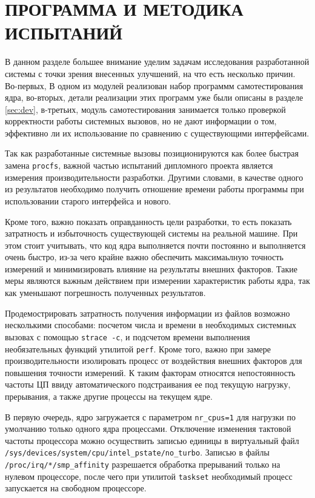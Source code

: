\pagebreak
\section{ПРОГРАММА И МЕТОДИКА ИСПЫТАНИЙ}
\label{sec:testing}

В данном разделе большее внимание уделим задачам исследования разработанной
системы с точки зрения внесенных улучшений, на что есть несколько причин.
Во-первых, В одном из модулей реализован набор программм самотестирования
ядра, во-вторых, детали реализации этих программ уже были описаны в разделе
\ref{sec:dev}, в-третьих, модуль самотестирования занимается только проверкой
корректности работы системных вызовов, но не дают информации о том, эффективно
ли их использование по сравнению с существующими интерфейсами.

Так как разработанные системные вызовы позиционируются как более быстрая замена
\texttt{procfs}, важной частью испытаний дипломного проекта является измерения
производительности разработки. Другими словами, в качестве одного из результатов
необходимо получить отношение времени работы программы при использовании старого
интерфейса и нового.

Кроме того, важно показать оправданность цели разработки, то есть показать
затратность и избыточность существующей системы на реальной машине. При этом
стоит учитывать, что код ядра выполняется почти постоянно и выполняется очень
быстро, из-за чего крайне важно обеспечить максимаьлную точность измерений и
минимизировать влияние на результаты внешних факторов. Такие меры являются
важным действием при измерении характеристик работы ядра, так как уменьшают
погрешность полученных результатов.

Продемострировать затратность получения информации из файлов возможно несколькими
способами: посчетом числа и времени в необходимых системных вызовах с помощью
\texttt{strace -c}, и подсчетом времени выполнения необязательных функций
утилитой \texttt{perf}. Кроме того, важно при замере производительности
изолировать процесс от воздействия внешних факторов для повышения точности
измерений. К таким факторам относятся непостоянность частоты ЦП ввиду
автоматического подстраивания ее под текущую нагрузку, прерывания, а также
другие процессы на текущем ядре.

В первую очередь, ядро загружается с параметром \texttt{nr\_cpus=1} для нагрузки
по умолчанию только одного ядра процессами.
Отключение изменения тактовой частоты процессора можно осуществить записью
единицы в виртуальный файл
\texttt{/sys/devices/system/cpu/intel\_pstate/no\_turbo}. Записью в файлы
\texttt{/proc/irq/*/smp\_affinity} разрешается обработка прерываний только на
нулевом процессоре, после чего при утилитой \texttt{taskset} необходимый
процесс запускается на свободном процессоре.

